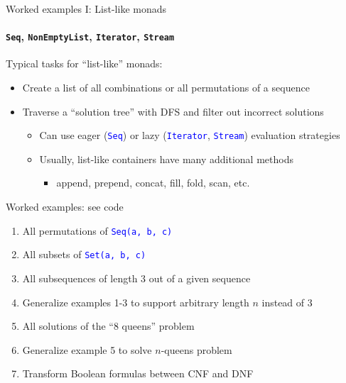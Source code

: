 \documentclass[english]{beamer}
\begin{document}
\begin{frame}{Worked examples I: List-like monads}


\framesubtitle{\texttt{\footnotesize{}Seq}, \texttt{\footnotesize{}NonEmptyList},
\texttt{\footnotesize{}Iterator}, \texttt{\footnotesize{}Stream}}

Typical tasks for ``list-like'' monads:
\begin{itemize}
\item Create a list of all combinations or all permutations of a sequence
\item Traverse a ``solution tree'' with DFS and filter out incorrect solutions
\begin{itemize}
\item Can use eager (\texttt{\textcolor{blue}{\footnotesize{}Seq}}) or lazy
(\texttt{\textcolor{blue}{\footnotesize{}Iterator}}, \texttt{\textcolor{blue}{\footnotesize{}Stream}})
evaluation strategies
\item Usually, list-like containers have many additional methods
\begin{itemize}
\item append, prepend, concat, fill, fold, scan, etc.
\end{itemize}
\end{itemize}
\end{itemize}
Worked examples: see code
\begin{enumerate}
\item All permutations of \texttt{\textcolor{blue}{\footnotesize{}Seq(\textquotedbl{}a\textquotedbl{},
\textquotedbl{}b\textquotedbl{}, \textquotedbl{}c\textquotedbl{})}} 
\item All subsets of \texttt{\textcolor{blue}{\footnotesize{}Set(\textquotedbl{}a\textquotedbl{},
\textquotedbl{}b\textquotedbl{}, \textquotedbl{}c\textquotedbl{})}} 
\item All subsequences of length 3 out of a given sequence
\item Generalize examples 1-3 to support arbitrary length $n$ instead of
3
\item All solutions of the ``8 queens'' problem
\item Generalize example 5 to solve $n$-queens problem
\item Transform Boolean formulas between CNF and DNF 
\end{enumerate}
\end{frame}
\end{document}
